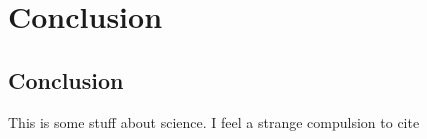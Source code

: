 \chapter{Conclusion}
\label{ch_conclusion}



\section{Conclusion}

This is some stuff about science. I feel a strange compulsion to cite

